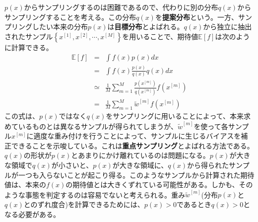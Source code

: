\documentclass[dvipdfmx,a4paper]{jsarticle}
\begin{document}
$p(x)$からサンプリングするのは困難であるので、代わりに別の分布$q(x)$からサンプリングすることを考える。この分布$q(x)$を\textbf{提案分布}という。一方、サンプリングしたい本来の分布$p(x)$は\textbf{目標分布}とよばれる。$q(x)$から独立に抽出されたサンプル$\left\{ x^{[1]}, x^{[2]}, \cdots, x^{[M]} \right\}$を用いることで、期待値$\mathbb{E}[f]$は次のように計算できる。
\begin{eqnarray}
	\mathbb{E}[f] &=& \int f(x) p(x) dx \nonumber \\
	&=& \int f(x) \frac{p(x)}{q(x)} q(x) dx \nonumber \\
	&\simeq& \frac{1}{M} \sum_{m = 1}^M \frac{p(x^{[m]})}{q(x^{[m]})} f(x^{[m]}) \\
	&=& \frac{1}{M} \sum_{m = 1}^M \widetilde{w}^{[m]} f(x^{[m]})
\end{eqnarray}
この式は、$p(x)$ではなく$q(x)$をサンプリングに用いることによって、本来求めているものとは異なるサンプルが得られてしまうが、$\widetilde{w}^{[m]}$を使って各サンプル$x^{[m]}$に適度な重み付けを行うことによって、サンプルに生じるバイアスを補正できることを示唆している。これは\textbf{重点サンプリング}とよばれる方法である。$q(x)$の形状が$p(x)$とあまりにかけ離れているのは問題になる。$p(x)$が大きな領域で$q(x)$が小さいと、$p(x)$が大きな領域に、$q(x)$から得られたサンプルが一つも入らないことが起こり得る。このようなサンプルから計算された期待値は、本来の$f(x)$の期待値とは大きくずれている可能性がある。しかも、そのような事態を判定するのは容易でないと考えられる。重み$\widetilde{w}^{[m]}$(分布$p(x)$と$q(x)$とのずれ度合)を計算できるためには、$p(x) > 0$であるとき$q(x) > 0$となる必要がある。\newline
\end{document}
